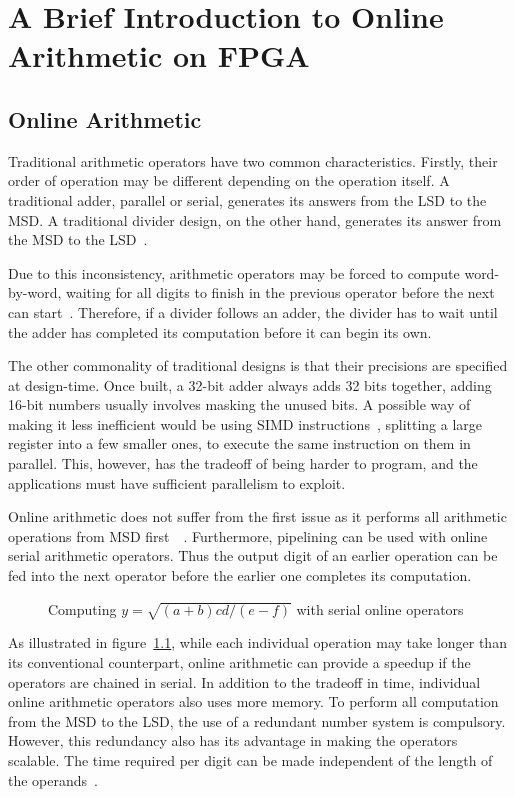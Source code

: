 \chapter{A Brief Introduction to Online Arithmetic on FPGA}

\section{Online Arithmetic}
Traditional arithmetic operators have two common characteristics.
Firstly, their order of operation may be different depending on the operation itself.
A traditional adder, parallel or serial, generates its answers from the LSD to the MSD.
A traditional divider design, on the other hand, generates its answer from the MSD to the LSD~\cite{Brent1}\cite{Srinivas1}.

Due to this inconsistency, arithmetic operators may be forced to compute word-by-word, waiting for all digits to finish in the previous operator before the next can start~\cite{Zhao1}.
Therefore, if a divider follows an adder, the divider has to wait until the adder has completed its computation before it can begin its own.

The other commonality of traditional designs is that their precisions are specified at design-time.
Once built, a 32-bit adder always adds 32 bits together, adding 16-bit numbers usually involves masking the unused bits.
A possible way of making it less inefficient would be using SIMD instructions~\cite{Duncan1}, splitting a large register into a few smaller ones, to execute the same instruction on them in parallel.
This, however, has the tradeoff of being harder to program, and the applications must have sufficient parallelism to exploit.

Online arithmetic does not suffer from the first issue as it performs all arithmetic operations from MSD first~\cite{Ercegovac1}~\cite{Ercegovac2}.
Furthermore, pipelining can be used with online serial arithmetic operators.
Thus the output digit of an earlier operation can be fed into the next operator before the earlier one completes its computation.

\begin{figure}[H]
  \centering
  
  \caption{Computing $y=\sqrt{(a+b)cd/(e-f)}$ with serial online operators~\cite{Ercegovac1}}
  \label{Online}
\end{figure}

As illustrated in figure~\ref{Online}, while each individual operation may take longer than its conventional counterpart, online arithmetic can provide a speedup if the operators are chained in serial.
In addition to the tradeoff in time, individual online arithmetic operators also uses more memory.
To perform all computation from the MSD to the LSD, the use of a redundant number system is compulsory.
However, this redundancy also has its advantage in making the operators scalable.
The time required per digit can be made independent of the length of the operands~\cite{Trivedi1}.

